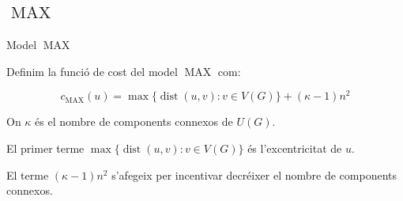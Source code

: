 \documentclass[aspectratio=169]{beamer}
\DeclareMathOperator{\dist}{dist}
\DeclareMathOperator{\MAX}{MAX}
\begin{document}
\subsection{\texorpdfstring{$\MAX$}{MAX}}
\begin{frame}{Model $\MAX$}

Definim la funció de cost del model $\MAX$ com:

\begin{equation}
    c_{\MAX}(u) = \max \{ \dist(u, v) : v \in V(G) \} + (\kappa - 1)n^2
\end{equation}

On $\kappa$ és el nombre de components connexos de $U(G)$.

\vspace{2em}

El primer terme $\max \{ \dist(u, v) : v \in V(G) \}$ és l'excentricitat de $u$.

El terme $(\kappa - 1)n^2$ s'afegeix per incentivar decréixer el nombre de components connexos.

\end{frame}
\end{document}
